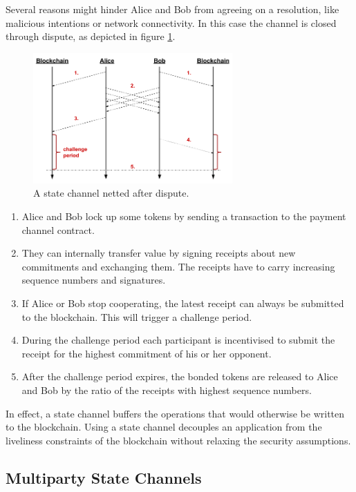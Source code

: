 Several reasons might hinder Alice and Bob from agreeing on a resolution, like malicious intentions or network connectivity. In this case the channel is closed through dispute, as depicted in figure \ref{pc_dispute}.

\begin{figure}[!ht]
\centering
\includegraphics[width=3.0in]{images/dispute.png}
\caption{A state channel netted after dispute.}
\label{pc_dispute}
\end{figure}

\begin{enumerate}
\item Alice and Bob lock up some tokens by sending a transaction to the payment channel contract.
\item They can internally transfer value by signing receipts about new commitments and exchanging them. The receipts have to carry increasing sequence numbers and signatures.
\item If Alice or Bob stop cooperating, the latest receipt can always be submitted to the blockchain. This will trigger a challenge period.
\item During the challenge period each participant is incentivised to submit the receipt for the highest commitment of his or her opponent.
\item After the challenge period expires, the bonded tokens are released to Alice and Bob by the ratio of the receipts with highest sequence numbers.
\end{enumerate}

In effect, a state channel buffers the operations that would otherwise be written to the blockchain. Using a state channel decouples an application from the liveliness constraints of the blockchain without relaxing the security assumptions.

\subsection{Multiparty State Channels}

